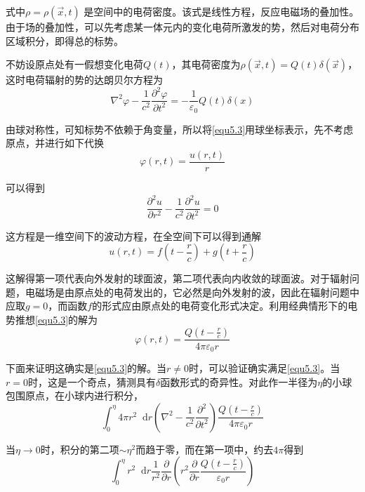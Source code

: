 \documentclass[UTF8]{ctexart}
\begin{document}
\noindent 式中$\rho = \rho(\vec{x},t)$ 是空间中的电荷密度。该式是线性方程，反应电磁场的叠加性。由于场的叠加性，可以先考虑某一体元内的变化电荷所激发的势，然后对电荷分布区域积分，即得总的标势。

    不妨设原点处有一假想变化电荷$Q(t)$，其电荷密度为$\rho(\vec{x},t) = Q(t) \delta(\vec{x})$，这时电荷辐射的势的达朗贝尔方程为
    \begin{equation}
        \nabla^{2} \varphi-\frac{1}{c^{2}} \frac{\partial^{2} \varphi}{\partial t^{2}}=-\frac{1}{\varepsilon_{0}} Q(t) \delta(x)\label{equ5.3}
        \end{equation}

\noindent 由球对称性，可知标势不依赖于角变量，所以将\autoref{equ5.3}用球坐标表示，先不考虑原点，并进行如下代换
\begin{equation}
    \varphi(r,t) = \frac{u(r,t)}{r}
\end{equation}

\noindent 可以得到
\begin{equation}
    \frac{\partial^2 u}{\partial r^2} - \frac{1}{c^2} \frac{\partial^2 u}{\partial t^2} = 0
\end{equation}

\noindent 这方程是一维空间下的波动方程，在全空间下可以得到通解
\begin{equation}
    u(r,t) = f(t-\frac{r}{c}) + g(t+\frac{r}{c})
\end{equation}

\noindent 这解得第一项代表向外发射的球面波，第二项代表向内收敛的球面波。对于辐射问题，电磁场是由原点处的电荷发出的，它必然是向外发射的波，因此在辐射问题中应取$g=0$，而函数$f$的形式应由原点处的电荷变化形式决定。利用经典情形下的电势推想\autoref{equ5.3}的解为
\begin{equation}
    \varphi(r,t) = \frac{Q(t-\frac{r}{c})}{4 \pi \varepsilon_0 r} \label{equ5.4}
\end{equation}

    下面来证明这确实是\autoref{equ5.3}的解。当$r \neq 0$时，可以验证确实满足\autoref{equ5.3}。当$r = 0$时，这是一个奇点，猜测具有$\delta$函数形式的奇异性。对此作一半径为$\eta$的小球包围原点，在小球内进行积分，
    \begin{equation}
        \int_{0}^{\eta} 4 \pi r^{2} \mathop{}\!\mathrm{d}  r\left(\nabla^{2}-\frac{1}{c^{2}} \frac{\partial^{2}}{\partial t^{2}}\right) \frac{Q\left(t-\frac{r}{c}\right)}{4 \pi \varepsilon_{0} r}
        \end{equation}

\noindent 当$\eta \to 0$时，积分的第二项$\sim \eta^2$而趋于零，而在第一项中，约去$4 \pi $得到
\begin{equation}
    \int_{0}^{\eta} r^2 \mathop{}\!\mathrm{d} r \frac{1}{r^2} \frac{\partial}{\partial r}\left(r^2 \frac{\partial}{\partial r} \frac{Q(t-\frac{r}{c})}{\varepsilon_0 r}\right)
\end{equation}
\end{document}
